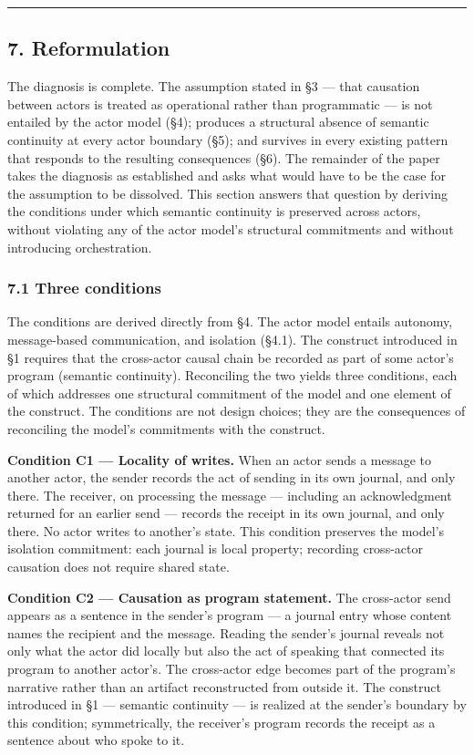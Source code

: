 \documentclass[
]{article}
\begin{document}
\begin{center}\rule{0.5\linewidth}{0.5pt}\end{center}

\subsection{7. Reformulation}\label{reformulation}

The diagnosis is complete. The assumption stated in §3 --- that
causation between actors is treated as operational rather than
programmatic --- is not entailed by the actor model (§4); produces a
structural absence of semantic continuity at every actor boundary (§5);
and survives in every existing pattern that responds to the resulting
consequences (§6). The remainder of the paper takes the diagnosis as
established and asks what would have to be the case for the assumption
to be dissolved. This section answers that question by deriving the
conditions under which semantic continuity is preserved across actors,
without violating any of the actor model's structural commitments and
without introducing orchestration.

\subsubsection{7.1 Three conditions}\label{three-conditions}

The conditions are derived directly from §4. The actor model entails
autonomy, message-based communication, and isolation (§4.1). The
construct introduced in §1 requires that the cross-actor causal chain be
recorded as part of some actor's program (semantic continuity).
Reconciling the two yields three conditions, each of which addresses one
structural commitment of the model and one element of the construct. The
conditions are not design choices; they are the consequences of
reconciling the model's commitments with the construct.

\textbf{Condition C1 --- Locality of writes.} When an actor sends a
message to another actor, the sender records the act of sending in its
own journal, and only there. The receiver, on processing the message ---
including an acknowledgment returned for an earlier send --- records the
receipt in its own journal, and only there. No actor writes to another's
state. This condition preserves the model's isolation commitment: each
journal is local property; recording cross-actor causation does not
require shared state.

\textbf{Condition C2 --- Causation as program statement.} The
cross-actor send appears as a sentence in the sender's program --- a
journal entry whose content names the recipient and the message. Reading
the sender's journal reveals not only what the actor did locally but
also the act of speaking that connected its program to another actor's.
The cross-actor edge becomes part of the program's narrative rather than
an artifact reconstructed from outside it. The construct introduced in
§1 --- semantic continuity --- is realized at the sender's boundary by
this condition; symmetrically, the receiver's program records the
receipt as a sentence about who spoke to it.
\end{document}
